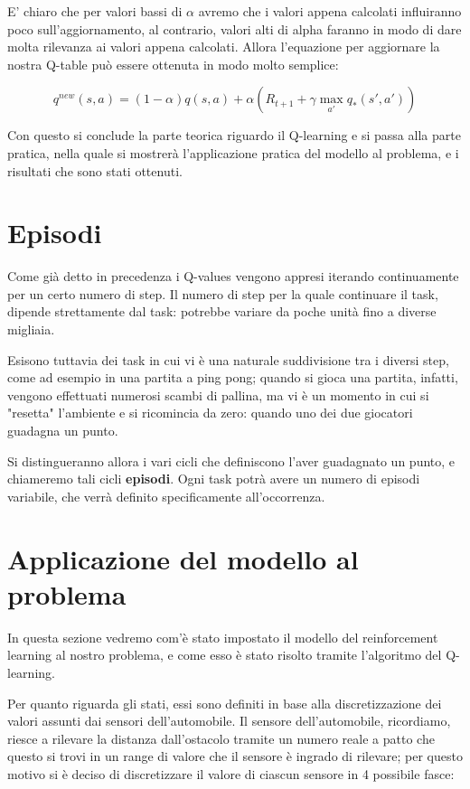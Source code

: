 \documentclass[a4paper,11pt,twoside]{report} %
\begin{document}
E' chiaro che per valori bassi di $\alpha$ avremo che i valori appena calcolati influiranno poco sull'aggiornamento, al contrario, valori alti di alpha faranno in modo di dare molta rilevanza ai valori appena calcolati. Allora l'equazione per aggiornare la nostra Q-table può essere ottenuta in modo molto semplice:

\begin{equation}
 q^{new}(s,a) = (1-\alpha)q(s,a) + \alpha(R_{t+1}+\gamma \max_{a'}q_{*}(s',a'))
\end{equation}

Con questo si conclude la parte teorica riguardo il Q-learning e si passa alla parte pratica, nella quale si mostrerà l'applicazione pratica del modello al problema, e i risultati che sono stati ottenuti.

\section{Episodi}

Come già detto in precedenza i Q-values vengono appresi iterando continuamente per un certo numero di step. Il numero di step per la quale continuare il task, dipende strettamente dal task: potrebbe variare da poche unità fino a diverse migliaia. 

Esisono tuttavia dei task in cui vi è una naturale suddivisione tra i diversi step, come ad esempio in una partita a ping pong; quando si gioca una partita, infatti, vengono effettuati numerosi scambi di pallina, ma vi è un momento in cui si "resetta" l'ambiente e si ricomincia da zero: quando uno dei due giocatori guadagna un punto. 

Si distingueranno allora i vari cicli che definiscono l'aver guadagnato un punto, e chiameremo tali cicli \textbf{episodi}. Ogni task potrà avere un numero di episodi variabile, che verrà definito specificamente all'occorrenza.

\section{Applicazione del modello al problema}

In questa sezione vedremo com'è stato impostato il modello del reinforcement learning al nostro problema, e come esso è stato risolto tramite l'algoritmo del Q-learning.

Per quanto riguarda gli stati, essi sono definiti in base alla discretizzazione dei valori assunti dai sensori dell'automobile. Il sensore dell'automobile, ricordiamo, riesce a rilevare la distanza dall'ostacolo tramite un numero reale a patto che questo si trovi in un range di valore che il sensore è ingrado di rilevare; per questo motivo si è deciso di discretizzare il valore di ciascun sensore in 4 possibile fasce:
\end{document}
